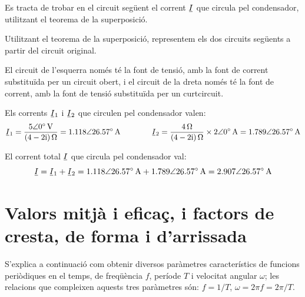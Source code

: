 \begin{exemple}\label{ex:Superposicio}
	\addcontentsxms{\Superposicio}
    Es tracta de trobar en el circuit següent el corrent $\cmplx{I}$ que circula
    pel condensador, utilitzant el teorema de la superposició.
    \begin{center}
        
    \end{center}

    Utilitzant el teorema de la superposició, representem els dos
    circuits següents a partir del circuit original. 
    
    El circuit de
    l'esquerra només té la font de tensió, amb la font de corrent substituïda per un circuit obert, i el circuit de
    la dreta només té la font de corrent, amb la font de tensió
    substituïda per un curtcircuit.
    
    \begin{center}
        
    \end{center}

    Els corrents $\cmplx{I}_1$ i $\cmplx{I}_2$ que circulen pel condensador valen:
    \[
        \cmplx{I}_1 = \frac{\complexqty{5:0}{V}}{\complexqty{4-2j}{\ohm}} =
        \complexqty{1,118:26,57}{A} \qquad\qquad
        \cmplx{I}_2 = \frac{\qty{4}{\ohm}}{\complexqty{4-2j}{ \ohm}} \times \complexqty{2:0}{A} = \complexqty{1,789:26,57}{A}
    \]

    El corrent total $\cmplx{I}$ que circula pel condensador val:
    \[
        \cmplx{I}  = \cmplx{I}_1 + \cmplx{I}_2 = \complexqty{1,118:26,57}{A} +  \complexqty{1,789:26,57}{A} =
        \complexqty{2,907:26,57}{A}
    \]
\end{exemple}



\section{Valors mitjà i eficaç, i factors de cresta, de forma i d'arrissada}\label{sec:val_mitja_ef}

S'explica a continuació com obtenir diversos paràmetres característics de funcions periòdiques  en el temps, de freqüència $f$, període $T$ i velocitat angular $\omega$; les relacions que compleixen aquests tres paràmetres són: $f = 1/T$, $\omega=2\pi f = 2\pi/T$.

